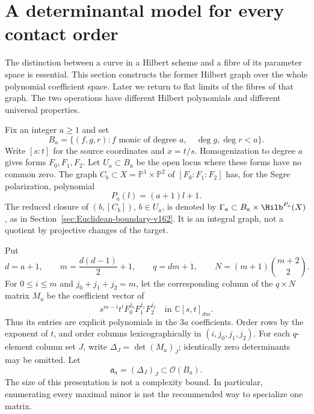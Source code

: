 \documentclass[11pt,reqno]{amsart}
\numberwithin{equation}{section}
\theoremstyle{definition}\newtheorem{definition}[theorem]{Definition}
\theoremstyle{remark}\newtheorem{remark}[theorem]{Remark}
\newcommand{\C}{\mathbb C}\newcommand{\Q}{\mathbb Q}
\newcommand{\Pj}{\mathbb P}\newcommand{\A}{\mathbb A}
\newcommand{\OO}{\mathcal O}\newcommand{\II}{\mathcal I}
\begin{document}
\appendix
\renewcommand{\thesection}{\AlphAlph{\value{section}}}

\section{A determinantal model for every contact order}
\label{sec:determinantal-v167}
The distinction between a curve in a Hilbert scheme and a fibre of
its parameter space is essential. This section constructs the former
Hilbert graph over the whole polynomial coefficient space. Later we
return to flat limits of the fibres of that graph. The two operations
have different Hilbert polynomials and different universal properties.

Fix an integer $a\geq1$ and set
\[
 B_a=\{(f,g,r):f\text{ monic of degree }a,\quad
                         \deg g,\deg r<a\}.
\]
Write $[s:t]$ for the source coordinates and $x=t/s$. Homogenization
to degree $a$ gives forms $F_0,F_1,F_2$. Let $U_a\subset B_a$ be
the open locus where these forms have no common zero. The graph
$C_b\subset X=\Pj^1\times\Pj^2$ of $[F_0:F_1:F_2]$ has, for the
Segre polarization, polynomial
\[
 P_a(l)=(a+1)l+1.
\]
The reduced closure of $(b,[C_b])$, $b\in U_a$, is denoted by
$\Gamma_a\subset B_a\times\Hilb^{P_a}(X)$, as in
Section~\ref{sec:Euclidean-boundary-v162}. It is an integral graph,
not a quotient by projective changes of the target.

Put
\begin{equation}\label{eq:hilbert-degree-v167}
 d=a+1,\qquad m=\frac{d(d-1)}2+1,\qquad
 q=dm+1,\qquad N=(m+1)\binom{m+2}{2}.
\end{equation}
For $0\leq i\leq m$ and $j_0+j_1+j_2=m$, let the corresponding
column of the $q\times N$ matrix $M_a$ be the coefficient vector of
\begin{equation}\label{eq:state-matrix-v167}
 s^{m-i}t^i F_0^{j_0}F_1^{j_1}F_2^{j_2}
                   \quad\text{in }\C[s,t]_{dm}.
\end{equation}
Thus its entries are explicit polynomials in the $3a$ coefficients.
Order rows by the exponent of $t$, and order columns
lexicographically in $(i,j_0,j_1,j_2)$. For each $q$-element column
set $J$, write $\Delta_J=\det(M_a)_J$; identically zero determinants
may be omitted. Let
\begin{equation}\label{eq:hilbert-ideal-v167}
                         \mathfrak a_a=(\Delta_J)_J\subset\OO(B_a).
\end{equation}
The size of this presentation is not a complexity bound. In
particular, enumerating every maximal minor is not the recommended
way to specialize one matrix.
\end{document}
